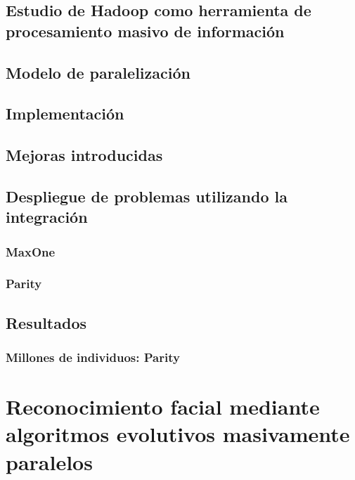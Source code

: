 \documentclass{estilos-y-libreria}
\begin{document}
	\section{Estudio de Hadoop como herramienta de procesamiento masivo de informaci\'on	\label{desarrollo-hadoop}}
		
	\section{Modelo de paralelizaci\'on}
		
	\section{Implementaci\'on}
		
	\section{Mejoras introducidas}\label{desarrollo-problema-mejoras}
		
	\section{Despliegue de problemas utilizando la integraci\'on}
		
		\subsection{MaxOne}
			
		\subsection{Parity}
			
	\section{Resultados}
			
		\subsection{Millones de individuos: Parity}
				
			
\chapter{Reconocimiento facial mediante algoritmos evolutivos masivamente paralelos}\label{facerecognition}
	
\end{document}
